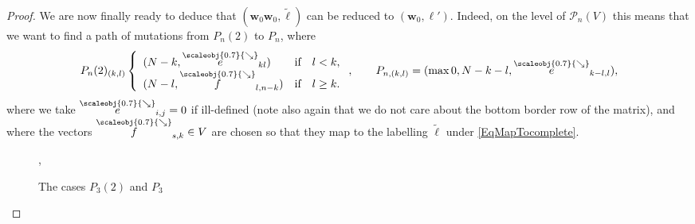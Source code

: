 \documentclass[11pt, reqno]{amsart}
\theoremstyle{definition}
\numberwithin{equation}{section}
\newcommand{\sears}{\scaleobj{0.7}{\searrow}}
\newcommand{\seee}{\overset{\sears}{e}}
\newcommand{\sef}{\overset{\scaleobj{0.7}{\searrow}}{f}}
\newcommand{\msP}{\mathscr{P}}
\begin{document}
\begin{proof}
We are now finally ready to deduce that $(\mathbf{w}_0\mathbf{w}_0,\widetilde{\ell})$ can be reduced to $(\mathbf{w}_0,\ell')$. Indeed, on the level of $\msP_n(V)$ this means that we want to find a path of mutations from $P_n(2)$ to $P_n$, where 
\[
P_n(2)_{(k,l)} \left\{\begin{array}{lll}(N-k,\seee_{kl})& \textrm{if}& l<k,\\
(N-l,\sef_{l,n-k})&\textrm{if}&l\geq k.\end{array}\right.,\qquad P_{n,(k,l)} = (\max{0,N-k-l},\seee_{k-l,l}),
\]
where we take $\seee_{i,j}= 0$ if ill-defined (note also again that we do not care about the bottom border row of the matrix), and where the vectors $\sef_{s,k}\in V$ are chosen so that they map to the labelling $\widetilde{\ell}$ under \eqref{EqMapTocomplete}. 

\begin{figure}[ht]\label{FigP2}
, \qquad \qquad

\caption{The cases $P_3(2)$ and $P_3$}
\end{figure}


\end{proof}
\end{document}

